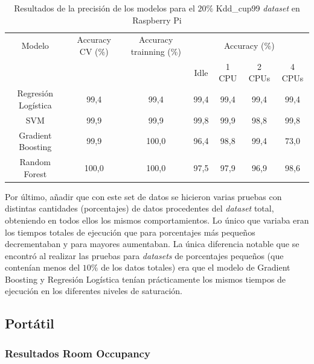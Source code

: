 \documentclass[a4paper, 12pt]{book}
\begin{document}
\begin{table}[htb]
\renewcommand{\arraystretch}{1.5}
\begin{adjustbox}{width=\textwidth}
\centering
    \begin{tabular}{c  c  c  c  c  c  c}
    \hline
    Modelo & Accuracy CV (\%) & Accuracy trainning (\%) & \multicolumn{4}{c}{Accuracy (\%)} \\
    \cline{4-7}
     &  &   &  Idle & 1 CPU & 2 CPUs & 4 CPUs \\
     \hline
     Regresión Logística & 99,4 & 99,4 & 99,4 & 99,4 & 99,4 & 99,4\\
     SVM & 99,9 & 99,9 & 99,8 & 99,9 & 98,8 & 99,8\\
     Gradient Boosting & 99,9 & 100,0 & 96,4 & 98,8 & 99,4 & 73,0\\
     Random Forest & 100,0 & 100,0 & 97,5 & 97,9 & 96,9 & 98,6\\
    \hline
    \end{tabular}
\end{adjustbox}
\caption{Resultados de la precisión de los modelos para el $20\%$ Kdd\_cup99 \textit{dataset} en Raspberry Pi}
\label{tab:acc_Kddraspberry}
\end{table}

Por último, añadir que con este set de datos se hicieron varias pruebas con distintas cantidades (porcentajes) de datos procedentes del \textit{dataset} total, obteniendo en todos ellos los mismos comportamientos. Lo único que variaba eran los tiempos totales de ejecución que para porcentajes más pequeños decrementaban y para mayores aumentaban. La única diferencia notable que se encontró al realizar las pruebas para \textit{datasets} de porcentajes pequeños (que contenían menos del $10\%$ de los datos totales) era que el modelo de Gradient Boosting y Regresión Logística tenían prácticamente los mismos tiempos de ejecución en los diferentes niveles de saturación.

\subsection{Portátil}
\label{subsec:pc_sinteticos}

\subsubsection{Resultados Room Occupancy}
\label{subsubsec:occ_pc}
\end{document}
